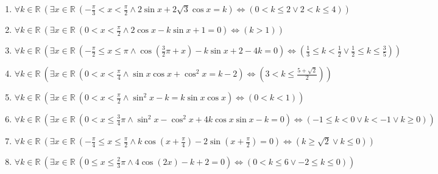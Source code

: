\documentclass[11pt,a4paper]{article}
\begin{document}
\begin{enumerate}
\item $\displaystyle \forall k \in \mathbb{R}\ \left( \exists x \in \mathbb{R}\ \left( -\frac{\pi}{3} < x < \frac{\pi}{2} \land 2\sin x + 2\sqrt{3}\cos x = k \right) \iff \left( 0 < k \le 2 \lor 2 < k \le 4 \right) \right)$
\item $\displaystyle \forall k \in \mathbb{R}\ \left( \exists x \in \mathbb{R}\ \left( 0 < x < \frac{\pi}{2} \land 2\cos x - k\sin x + 1 = 0 \right) \iff \left( k > 1 \right) \right)$
\item $\displaystyle \forall k \in \mathbb{R}\ \left( \exists x \in \mathbb{R}\ \left( -\frac{\pi}{2} \le x \le \pi \land \cos\left(\frac{3}{2}\pi + x\right) - k\sin x + 2 - 4k = 0 \right) \iff \left( \frac{1}{3} \le k < \frac{1}{2} \lor \frac{1}{2} \le k \le \frac{3}{5} \right) \right)$
\item $\displaystyle \forall k \in \mathbb{R}\ \left( \exists x \in \mathbb{R}\ \left( 0 < x < \frac{\pi}{4} \land \sin x \cos x + \cos^{2} x = k - 2 \right) \iff \left( 3 < k \le \frac{5 + \sqrt{2}}{2} \right) \right)$
\item $\displaystyle \forall k \in \mathbb{R}\ \left( \exists x \in \mathbb{R}\ \left( 0 < x < \frac{\pi}{2} \land \sin^{2} x - k = k\sin x \cos x \right) \iff \left( 0 < k < 1 \right) \right)$
\item $\displaystyle \forall k \in \mathbb{R}\ \left( \exists x \in \mathbb{R}\ \left( 0 < x \le \frac{3}{4}\pi \land \sin^{2} x - \cos^{2} x + 4k\cos x \sin x - k = 0 \right) \iff \left( -1 \le k < 0 \lor k < -1 \lor k \ge 0 \right) \right)$
\item $\displaystyle \forall k \in \mathbb{R}\ \left( \exists x \in \mathbb{R}\ \left( -\frac{\pi}{4} \le x \le \frac{\pi}{2} \land k\cos\left(x + \frac{\pi}{4}\right) - 2\sin\left(x + \frac{\pi}{2}\right) = 0 \right) \iff \left( k \ge \sqrt{2} \lor k \le 0 \right) \right)$
\item $\displaystyle \forall k \in \mathbb{R}\ \left( \exists x \in \mathbb{R}\ \left( 0 \le x \le \frac{2}{3}\pi \land 4\cos\left(2x\right) - k + 2 = 0 \right) \iff \left( 0 < k \le 6 \lor -2 \le k \le 0 \right) \right)$
\end{enumerate}
\end{document}
